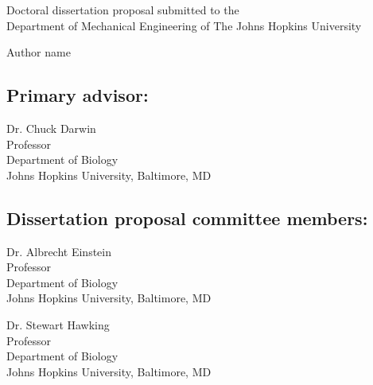 \thispagestyle{empty}
\TitlePageSpacing

\begin{center}
    Doctoral dissertation proposal submitted to the \\
    Department of Mechanical Engineering of The Johns Hopkins University
    
    \vspace{0.5in}                      %
    { \par}  
    
    \vspace{0.25in}                     %
    
    Author name                         %
\end{center}


\vspace{0.5in}
\begin{singlespace}
    \subsection*{Primary advisor:}
    
    Dr. Chuck Darwin \\
    Professor \\
    Department of Biology \\
    Johns Hopkins University, Baltimore, MD


    \subsection*{Dissertation proposal committee members:} 
    
    Dr. Albrecht Einstein \\
    Professor\\
    Department of Biology \\
    Johns Hopkins University, Baltimore, MD
    
    Dr. Stewart Hawking \\
    Professor\\
    Department of Biology \\
    Johns Hopkins University, Baltimore, MD 
\end{singlespace}

